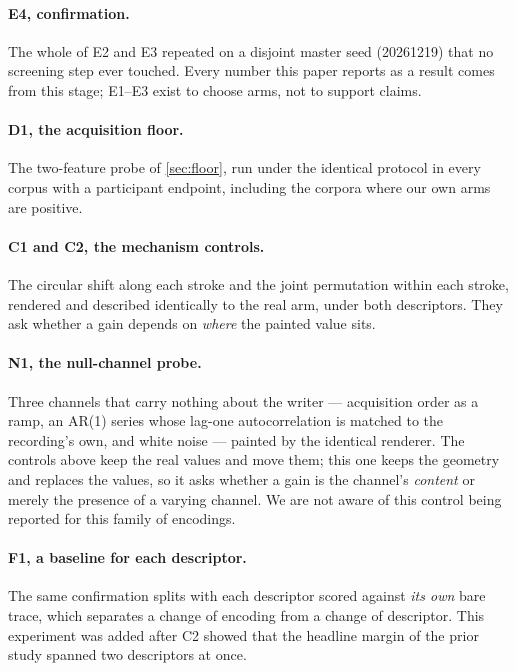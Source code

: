\paragraph{E4, confirmation.} The whole of E2 and E3 repeated on a disjoint master seed
(20261219) that no screening step ever touched. Every number this paper reports as a result comes
from this stage; E1--E3 exist to choose arms, not to support claims.

\paragraph{D1, the acquisition floor.} The two-feature probe of \cref{sec:floor}, run under the
identical protocol in every corpus with a participant endpoint, including the corpora where our own
arms are positive.

\paragraph{C1 and C2, the mechanism controls.} The circular shift along each stroke and the joint
permutation within each stroke, rendered and described identically to the real arm, under both
descriptors. They ask whether a gain depends on \emph{where} the painted value sits.

\paragraph{N1, the null-channel probe.} Three channels that carry nothing about the writer ---
acquisition order as a ramp, an AR(1) series whose lag-one autocorrelation is matched to the
recording's own, and white noise --- painted by the identical renderer. The controls above keep the
real values and move them; this one keeps the geometry and replaces the values, so it asks whether
a gain is the channel's \emph{content} or merely the presence of a varying channel. We are not
aware of this control being reported for this family of encodings.

\paragraph{F1, a baseline for each descriptor.} The same confirmation splits with each descriptor
scored against \emph{its own} bare trace, which separates a change of encoding from a change of
descriptor. This experiment was added after C2 showed that the headline margin of the prior study
spanned two descriptors at once.

